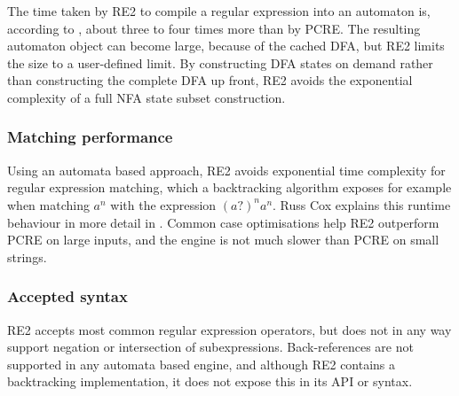 The time taken by RE2 to compile a regular expression into an automaton is,
according to \cite{regexp3}, about three to four times more than by PCRE. The
resulting automaton object can become large, because of the cached DFA, but RE2
limits the size to a user-defined limit. By constructing DFA states on demand
rather than constructing the complete DFA up front, RE2 avoids the exponential
complexity of a full NFA state subset construction.


\subsubsection{Matching performance}

Using an automata based approach, RE2 avoids exponential time complexity for
regular expression matching, which a backtracking algorithm exposes for example
when matching $a^n$ with the expression $(a?)^na^n$. Russ Cox explains this
runtime behaviour in more detail in \cite{regexp1}. Common case optimisations
help RE2 outperform PCRE on large inputs, and the engine is not much slower than
PCRE on small strings.


\subsubsection{Accepted syntax}

RE2 accepts most common regular expression operators, but does not in any way
support negation or intersection of subexpressions. Back-references are not
supported in any automata based engine, and although RE2 contains a backtracking
implementation, it does not expose this in its API or syntax.


